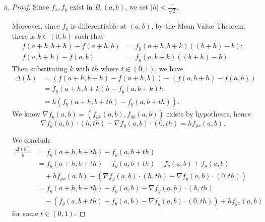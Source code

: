 \begin{Exercise}
\begin{enumerate}[a)]
\item
\begin{proof}
Since $f_x, f_y$ exist in $B_r(a,b)$, we set $|h|<\frac{r}{\sqrt{2}}$.

Moreover, since $f_y$ is differentiable at $(a,b)$, by the Mean Value Theorem, there is $k\in(0,h)$ such that
\begin{align*}
f(a+h,b+h)-f(a+h,b) &= f_y(a+h,b+k) ((b+h)-b); \\
f(a,b+h)-f(a,b) &= f_y(a,b+k) ((b+h)-b).
\end{align*}
Then substituting $k$ with $t h$ where $t\in(0,1)$, we have
\begin{align*}
\Delta(h)
&= (f(a+h,b+h)-f(a+h,b)) - (f(a,b+h)-f(a,b)) \\
&= f_y(a+h, b+k) h - f_y(a,b+k) h \\
&= h\left( f_y(a+h,b+t h)-f_y(a,b+t h) \right).
\end{align*}
We know $\nabla f_y(a,b) = (f_{y x}(a,b), f_{y y}(a,b))$ exists by hypotheses, hence
$$
\nabla f_y(a,b)\cdot(h,t h)-\nabla f_y(a,b)\cdot(0,t h)
= h f_{y x}(a,b).
$$

We conclude
\begin{align*}
\frac{\Delta(h)}{h}
&= f_y(a+h,b+t h)-f_y(a,b+t h) \\
&= f_y(a+h,b+t h)-f_y(a,b+t h) - f_y(a,b) + f_y(a,b) \\
&\quad + h f_{y x}(a,b) - \left( \nabla f_y(a,b)\cdot(h,t h)-\nabla f_y(a,b)\cdot(0,t h) \right) \\
&= f_y(a+h,b+ t h)-f_y(a,b)-\nabla f_y(a,b)\cdot(h,t h)\\
&\quad -\left( f_y(a,b+t h)-f_y(a,b)-\nabla f_y(a,b)\cdot(0,t h) \right) + h f_{y x}(a,b)
\end{align*}
for some $t\in(0,1)$.
\end{proof}


\end{enumerate}
\end{Exercise}
